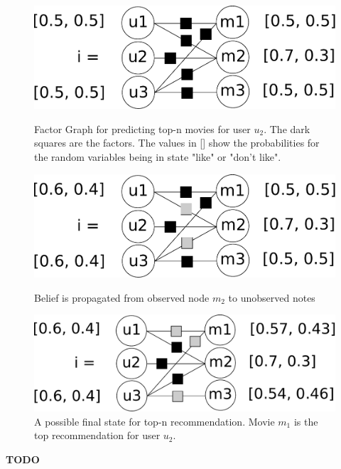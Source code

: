\begin{figure}[!htb]

    \includegraphics[scale=0.33]{graphics/top-n-graph.pdf}
 \caption{Factor Graph for predicting top-n movies for user $u_2$. The dark squares are the factors. The values in [] show the probabilities for the random variables being in state "like" or "don't like".\label{top_n_graph}}
\endminipage\hfill

    \includegraphics[scale=0.33]{graphics/top-n-important-messages.pdf}
  \caption{Belief is propagated from observed node $m_2$ to unobserved notes \label{top_n_graph_important_msg}}
\endminipage\hfill

    \includegraphics[scale=0.33]{graphics/top-n-final.pdf}
  \caption{A possible final state for top-n recommendation. Movie $m_1$ is the top recommendation for user $u_2$. \label{top_n_graph_final_state}}
\endminipage

\end{figure}


\textbf{TODO}

%
%
%
